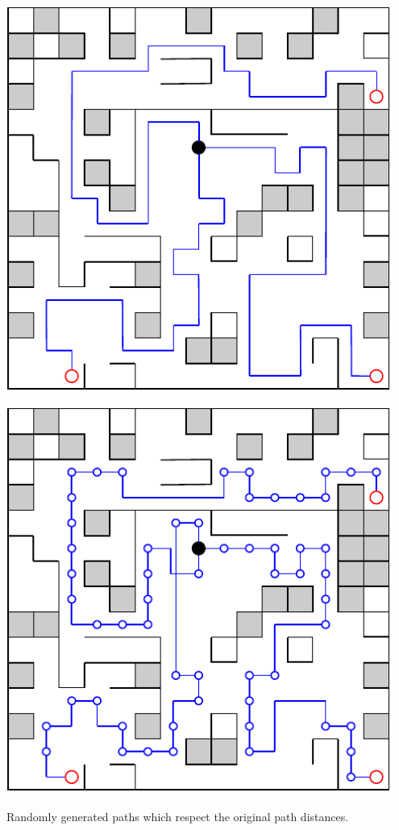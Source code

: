\begin{center}
    \captionsetup{type=figure}
    \begin{minipage}{.5\textwidth}
        \centering
        \includegraphics[width=0.95\textwidth]{img/Paths and world.pdf}
    \end{minipage}%
    \begin{minipage}{.5\textwidth}
        \centering
        \includegraphics[width=0.95\textwidth]{img/Rnadom but respecting the originals.pdf}
    \end{minipage}
    \caption{Randomly generated paths which respect the original path distances.}
    \label{fig:respect-originals}
\end{center}

